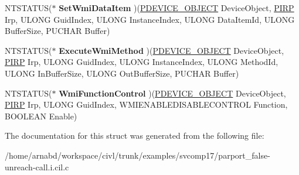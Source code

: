 \begin{DoxyCompactItemize}
\item 
\hypertarget{struct__WMILIB__CONTEXT_aea1dbc1ded6aefe93d3a670482553d89}{}N\+T\+S\+T\+A\+T\+U\+S($\ast$ {\bfseries Set\+Wmi\+Data\+Item} )(\hyperlink{struct__DEVICE__OBJECT}{P\+D\+E\+V\+I\+C\+E\+\_\+\+O\+B\+J\+E\+C\+T} Device\+Object, \hyperlink{struct__IRP}{P\+I\+R\+P} Irp, U\+L\+O\+N\+G Guid\+Index, U\+L\+O\+N\+G Instance\+Index, U\+L\+O\+N\+G Data\+Item\+Id, U\+L\+O\+N\+G Buffer\+Size, P\+U\+C\+H\+A\+R Buffer)\label{struct__WMILIB__CONTEXT_aea1dbc1ded6aefe93d3a670482553d89}

\item 
\hypertarget{struct__WMILIB__CONTEXT_adad3d0fc62081806e93918a578ce8466}{}N\+T\+S\+T\+A\+T\+U\+S($\ast$ {\bfseries Execute\+Wmi\+Method} )(\hyperlink{struct__DEVICE__OBJECT}{P\+D\+E\+V\+I\+C\+E\+\_\+\+O\+B\+J\+E\+C\+T} Device\+Object, \hyperlink{struct__IRP}{P\+I\+R\+P} Irp, U\+L\+O\+N\+G Guid\+Index, U\+L\+O\+N\+G Instance\+Index, U\+L\+O\+N\+G Method\+Id, U\+L\+O\+N\+G In\+Buffer\+Size, U\+L\+O\+N\+G Out\+Buffer\+Size, P\+U\+C\+H\+A\+R Buffer)\label{struct__WMILIB__CONTEXT_adad3d0fc62081806e93918a578ce8466}

\item 
\hypertarget{struct__WMILIB__CONTEXT_a35bd7bfbe3e516e54aa917f3d986fb19}{}N\+T\+S\+T\+A\+T\+U\+S($\ast$ {\bfseries Wmi\+Function\+Control} )(\hyperlink{struct__DEVICE__OBJECT}{P\+D\+E\+V\+I\+C\+E\+\_\+\+O\+B\+J\+E\+C\+T} Device\+Object, \hyperlink{struct__IRP}{P\+I\+R\+P} Irp, U\+L\+O\+N\+G Guid\+Index, W\+M\+I\+E\+N\+A\+B\+L\+E\+D\+I\+S\+A\+B\+L\+E\+C\+O\+N\+T\+R\+O\+L Function, B\+O\+O\+L\+E\+A\+N Enable)\label{struct__WMILIB__CONTEXT_a35bd7bfbe3e516e54aa917f3d986fb19}

\end{DoxyCompactItemize}


The documentation for this struct was generated from the following file\+:\begin{DoxyCompactItemize}
\item 
/home/arnabd/workspace/civl/trunk/examples/svcomp17/parport\+\_\+false-\/unreach-\/call.\+i.\+cil.\+c\end{DoxyCompactItemize}
